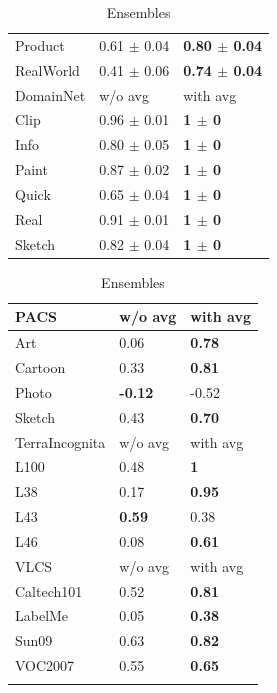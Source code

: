\begin{table}[t]
\begin{minipage}{.5\linewidth}
\begin{tabular}{lll}
        Product   & 0.61 $\pm$ 0.04   & \textbf{0.80 $\pm$ 0.04} \\
        RealWorld  & 0.41 $\pm$ 0.06   & \textbf{0.74 $\pm$ 0.04}  \\ \hhline{===}
        DomainNet    & w/o avg & with avg   \\ \hline
        Clip     & 0.96 $\pm$ 0.01   & \textbf{1 $\pm$ 0}   \\
        Info & 0.80 $\pm$ 0.05   & \textbf{1 $\pm$ 0}  \\
        Paint   & 0.87 $\pm$ 0.02   & \textbf{1 $\pm$ 0} \\
        Quick  & 0.65 $\pm$ 0.04   & \textbf{1 $\pm$ 0}  \\ 
        Real   & 0.91 $\pm$ 0.01   & \textbf{1 $\pm$ 0} \\
        Sketch  & 0.82 $\pm$ 0.04   & \textbf{1 $\pm$ 0}  \\ 
        \hline
        \end{tabular}
        \label{tab:rank_correlation}
    \end{minipage}%
    \begin{minipage}{.5\linewidth}
      \centering
        \caption{Ensembles}
        \begin{tabular}{lll}
        \hhline{===}
        PACS    & w/o avg & with avg   \\ \hline
        Art     & 0.06   & \textbf{0.78}   \\
        Cartoon & 0.33   & \textbf{0.81}  \\
        Photo   & \textbf{-0.12}   & -0.52 \\
        Sketch  & 0.43   & \textbf{0.70}  \\ \hhline{===}
        TerraIncognita    & w/o avg & with avg   \\ \hline
        L100     & 0.48   & \textbf{1}   \\
        L38 & 0.17   & \textbf{0.95}  \\
        L43   & \textbf{0.59}   & 0.38 \\
        L46  & 0.08   & \textbf{0.61}  \\ 
        \hhline{===}
        VLCS    & w/o avg & with avg   \\ \hline
        Caltech101     & 0.52   & \textbf{0.81}   \\
        LabelMe & 0.05   &\textbf{ 0.38}  \\
        Sun09   & 0.63   & \textbf{0.82} \\
        VOC2007  & 0.55   & \textbf{0.65}  \\ \hhline{===}

\end{tabular}
\end{minipage}
\end{table}

